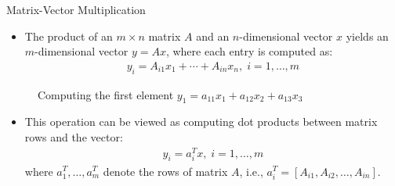 
\begin{frame}{Matrix-Vector Multiplication}
\begin{itemize}
    \item The product of an $m\times n$ matrix $A$ and an $n$-dimensional vector $x$ yields an $m$-dimensional vector $y = Ax$, where each entry is computed as:
    \begin{align*}
        y_i = A_{i1}x_1 + \cdots + A_{in}x_n, \; i=1, \ldots, m
    \end{align*}
    
\end{itemize} 
\end{frame}

\begin{frame}{}
\begin{figure}[h]
    \begin{center}
    \caption{Computing the first element $y_1 = a_{11}x_1 + a_{12}x_2 + a_{13}x_3$}
    \label{fig:matrix-vector-multiplication}
    \end{center}
\end{figure}
\begin{itemize}
    \item This operation can be viewed as computing dot products between matrix rows and the vector:
    \begin{align}
        y_i= a_i^T x, \; i=1, \ldots, m
    \end{align}
    where $a^T_1, \ldots, a^T_m$ denote the rows of matrix $A$, i.e., $a_i^T = [A_{i1}, A_{i2}, \ldots, A_{in}]$.
\end{itemize}
\end{frame}

